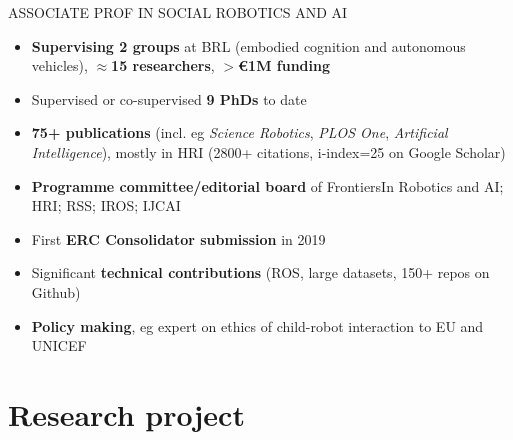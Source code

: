 \documentclass[xcolor=table]{beamer}
\makeatletter
\let\beamer@writeslidentry@miniframeson=\beamer@writeslidentry
\def\beamer@writeslidentry@miniframesoff{%
  \expandafter\beamer@ifempty\expandafter{\beamer@framestartpage}{}%
  {%
    \clearpage\beamer@notesactions%
  }
}
\newcommand*{\miniframeson}{\let\beamer@writeslidentry=\beamer@writeslidentry@miniframeson}
\newcommand*{\miniframesoff}{\let\beamer@writeslidentry=\beamer@writeslidentry@miniframesoff}
\makeatother
\begin{document}
\miniframesoff{}

\begin{frame}{ASSOCIATE PROF IN SOCIAL ROBOTICS AND AI}
    \begin{itemize}
        \item \textbf{Supervising 2 groups} at BRL (embodied cognition and autonomous
            vehicles), $\approx$\textbf{15 researchers}, \textbf{$>$€1M funding}
        \item Supervised or co-supervised \textbf{9 PhDs} to date
        \item \textbf{75+ publications} (incl. eg \emph{Science Robotics}, \emph{PLOS One},
            \emph{Artificial Intelligence}), mostly in HRI (2800+ citations, i-index=25 on Google Scholar)
        \item \textbf{Programme committee/editorial board} of FrontiersIn Robotics and
            AI; HRI; RSS; IROS; IJCAI
        \item First \textbf{ERC Consolidator submission} in 2019
        \item Significant \textbf{technical contributions} (ROS, large datasets, 150+
            repos on Github)
        \item \textbf{Policy making}, eg expert on ethics of child-robot interaction to EU and UNICEF
    \end{itemize}

\end{frame}






\miniframeson{}

\section{Research project}
\end{document}
